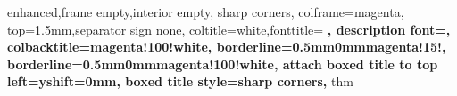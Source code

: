 \usepackage[left=1.1in,right=1.1in]{geometry}
\usepackage[secthm,mdthm]{evan}
\usepackage[most]{tcolorbox}
\usepackage{cancel}
\usepackage[labelfont=bf,sf, font=sf]{caption}
\usepackage{bm}

\setcounter{section}{-1}


\newcommand{\bsquare}{\hfill$\blacksquare$\par\medskip}
\newenvironment{sol}{%
     \par\medskip\noindent\textit{Solution.}}{%
     \hfill$\blacksquare$\par\medskip}

%
    {enhanced,frame empty,interior empty, sharp corners, colframe=magenta, top=1.5mm,separator sign none, coltitle=white,fonttitle=
    \sffamily \bfseries, description font=\mdseries\sffamily, colbacktitle=magenta!100!white,
        borderline={0.5mm}{0mm}{magenta!15!},
        borderline={0.5mm}{0mm}{magenta!100!white},
        attach boxed title to top left={yshift=0mm},
        boxed title style=sharp corners,
    }{thm} %

\makeatletter
\renewcommand*{\eqref}[1]{%
  \hyperref[{#1}]{\textup{\tagform@{\ref*{#1}}}}%
}
\makeatother
